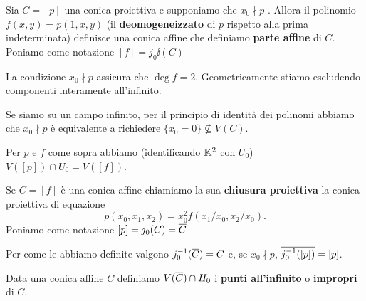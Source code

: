 \begin{multicols*}{2}
    \begin{definition}
    Sia $C=[p]$ una conica proiettiva e supponiamo che $x_0\nmid p$ . Allora il polinomio $f(x,y)=p(1,x,y)$ (il \textbf{deomogeneizzato} di $p$ rispetto alla prima indeterminata) definisce una conica affine che definiamo \textbf{parte affine} di $C$.\\
    \noindent
    Poniamo come notazione $[f]=j_0\ii(C)$
    \end{definition}
    \begin{remark}
    La condizione $x_0\nmid p$ assicura che $\deg f=2$. Geometricamente stiamo escludendo componenti interamente all'infinito.
    \end{remark}
    \begin{remark}
    Se siamo su un campo infinito, per il principio di identit\`a dei polinomi abbiamo che $x_0\nmid p$ \`e equivalente a richiedere $\{x_0=0\}\not\subseteq V(C)$.
    \end{remark}
    \begin{proposition}
    Per $p$ e $f$ come sopra abbiamo (identificando $\mathbb{K}^2$ con $U_0$) $V([p])\cap U_0=V([f])$.
    \end{proposition}

    \begin{definition}
    Se $C=[f]$ \`e una conica affine chiamiamo la sua \textbf{chiusura proiettiva} la conica proiettiva di equazione
    \[p(x_0,x_1,x_2)=x_0^2f(x_1/x_0,x_2/x_0).\]
    Poniamo come notazione $[p]=j_0(C)=\overline{C}$.
    \end{definition}



    \begin{remark}
    Per come le abbiamo definite valgono
    $j_0^{-1}(\overline{C})=C$ e, se $x_0\nmid p$, $\overline{j_0^{-1}([p])}=[p]$.
    \end{remark}

    \begin{definition}
    Data una conica affine $C$ definiamo $V(\overline{C})\cap H_0$ i \textbf{punti all'infinito} o \textbf{impropri} di $C$.
    \end{definition}


\end{multicols*}
